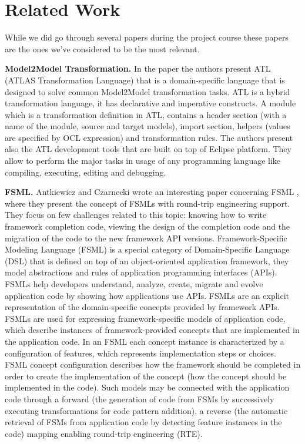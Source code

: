 \section{Related Work}
\label{relatedwork}
While we did go through several papers during the project course these papers are the ones we've considered to be the most relevant.

\textbf{Model2Model Transformation.} In the paper \cite{atl} the authors present ATL (ATLAS Transformation Language) that is a domain-specific language that is designed to solve common Model2Model transformation tasks. ATL is a hybrid transformation language, it has declarative and imperative constructs. A module which is a transformation definition in ATL, contains a header section (with a name of the module, source and target models), import section, helpers (values are specified by OCL expression) and transformation rules. The authors present also the ATL development tools that are built on top of Eclipse platform. They allow to perform the major tasks in usage of any programming language like compiling, executing, editing and debugging.


\textbf{FSML.} Antkiewicz and Czarnecki wrote an interesting paper concerning FSML \cite{FSML}, where they present the concept of FSMLs with round-trip engineering support. They focus on few challenges related to this topic: knowing how to write framework completion code, viewing the design of the completion code and the migration of the code to the new framework API versions. Framework-Specific Modeling Language (FSML) is a special category of Domain-Specific Language (DSL) that is defined on top of an object-oriented application framework, they model abstractions and rules of application programming interfaces (APIs). FSMLs help developers understand, analyze, create, migrate and evolve application code by showing how applications use APIs. FSMLs are an explicit representation of the domain-specific concepts provided by framework APIs. FSMLs are used for expressing framework-specific models of application code, which describe instances of framework-provided concepts that are implemented in the application code. In an FSML each concept instance is characterized by a configuration of features, which represents implementation steps or choices. FSML concept configuration describes how the framework should be completed in order to create the implementation of the concept (how the concept should be implemented in the code). Such models may be connected with the application code through a forward (the generation of code from FSMs by successively executing transformations for code pattern addition), a reverse (the automatic retrieval of FSMs from application code by detecting feature instances in the code) mapping enabling round-trip engineering (RTE).
